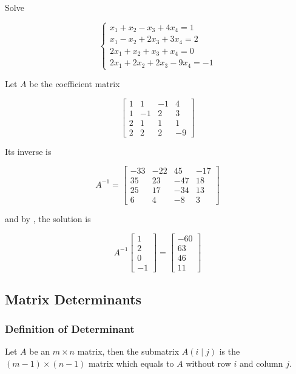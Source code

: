 \documentclass[a4paper,12pt]{article}
\begin{document}
\begin{exm}
  Solve

  $$\begin{cases}
    x_{1}+x_{2}-x_{3}+4x_{4}=1\\
    x_{1}-x_{2}+2x_{3}+3x_{4}=2\\
    2x_{1}+x_{2}+x_{3}+x_{4}=0\\
    2x_{1}+2x_{2}+2x_{3}-9x_{4}=-1
  \end{cases}$$\s

  \ans Let $A$ be the coefficient matrix

  $$\begin{bmatrix}
    1 & 1 & -1 & 4\\
    1 & -1 & 2 & 3\\
    2 & 1 & 1 & 1\\
    2 & 2 & 2 & -9
  \end{bmatrix}$$\s

  Its inverse is

  $$A^{-1}=\begin{bmatrix}
    -33 & -22 & 45 & -17\\
    35 & 23 & -47 & 18\\
    25 & 17 & -34 & 13\\
    6 & 4 & -8 & 3
  \end{bmatrix}$$\s

  and by \rthm[\sctd{1}], the solution is

  $$A^{-1}\begin{bmatrix}
    1\\
    2\\
    0\\
    -1
  \end{bmatrix}=\begin{bmatrix}
    -60\\
    63\\
    46\\
    11
  \end{bmatrix}$$
\end{exm}

\subsection{Matrix Determinants}
\subsubsection{Definition of Determinant}
\begin{dft}
  Let $A$ be an $m\times n$ matrix, then the submatrix $A(i\!\mid\!j)$ is the $(m-1)\times(n-1)$ matrix which equals to $A$ without row $i$ and column $j$.
\end{dft}\n
\end{document}
